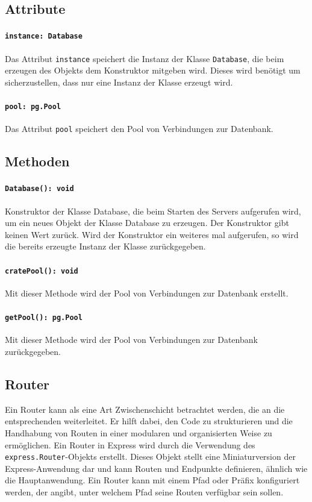 \documentclass{entwurfsheft}
\begin{document}
\begin{sloppypar}
\subsection*{Attribute}
\paragraph{\texttt{instance: Database}}
Das Attribut \texttt{instance} speichert die Instanz der Klasse \texttt{Database}, die beim erzeugen des Objekts dem Konstruktor mitgeben wird.
Dieses wird benötigt um sicherzustellen, dass nur eine Instanz der Klasse erzeugt wird.
\paragraph{\texttt{pool: pg.Pool}}
Das Attribut \texttt{pool} speichert den Pool von Verbindungen zur Datenbank.
\subsection*{Methoden}
\paragraph{\texttt{Database(): void}}
Konstruktor der Klasse Database, die beim Starten des Servers aufgerufen wird, um ein neues Objekt der Klasse Database zu erzeugen. Der Konstruktor gibt keinen Wert zurück.
Wird der Konstruktor ein weiteres mal aufgerufen, so wird die bereits erzeugte Instanz der Klasse zurückgegeben.
\paragraph{\texttt{cratePool(): void}}
Mit dieser Methode wird der Pool von Verbindungen zur Datenbank erstellt.
\paragraph{\texttt{getPool(): pg.Pool}}
Mit dieser Methode wird der Pool von Verbindungen zur Datenbank zurückgegeben.


\subsection{Router} \label{sec:Router}
Ein Router kann als eine Art Zwischenschicht betrachtet werden, die  an die entsprechenden  weiterleitet.
Er hilft dabei, den Code zu strukturieren und die Handhabung von Routen in einer modularen und organisierten Weise zu ermöglichen.
Ein Router in Express wird durch die Verwendung des \texttt{express.Router}-Objekts erstellt.
Dieses Objekt stellt eine Miniaturversion der Express-Anwendung dar und kann Routen und Endpunkte definieren, ähnlich wie die Hauptanwendung.
Ein Router kann mit einem Pfad oder Präfix konfiguriert werden, der angibt, unter welchem Pfad seine Routen verfügbar sein sollen.


\end{sloppypar}
\end{document}
